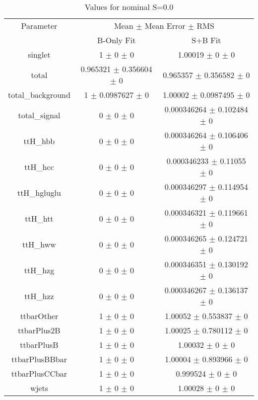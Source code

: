\begin{table}
\centering
\caption{Values for nominal S=0.0}
\begin{tabular}{ccc}
\toprule
Parameter & \multicolumn{2}{c}{Mean $\pm$ Mean Error $\pm$ RMS}\\
 & B-Only Fit & S+B Fit\\
\midrule
singlet & \num{1} $\pm$ \num{0} $\pm$ \num{0} & \num{1.00019} $\pm$ \num{0} $\pm$ \num{0}\\
total & \num{0.965321} $\pm$ \num{0.356604} $\pm$ \num{0} & \num{0.965357} $\pm$ \num{0.356582} $\pm$ \num{0}\\
total\_background & \num{1} $\pm$ \num{0.0987627} $\pm$ \num{0} & \num{1.00002} $\pm$ \num{0.0987495} $\pm$ \num{0}\\
total\_signal & \num{0} $\pm$ \num{0} $\pm$ \num{0} & \num{0.000346264} $\pm$ \num{0.102484} $\pm$ \num{0}\\
ttH\_hbb & \num{0} $\pm$ \num{0} $\pm$ \num{0} & \num{0.000346264} $\pm$ \num{0.106406} $\pm$ \num{0}\\
ttH\_hcc & \num{0} $\pm$ \num{0} $\pm$ \num{0} & \num{0.000346233} $\pm$ \num{0.11055} $\pm$ \num{0}\\
ttH\_hgluglu & \num{0} $\pm$ \num{0} $\pm$ \num{0} & \num{0.000346297} $\pm$ \num{0.114954} $\pm$ \num{0}\\
ttH\_htt & \num{0} $\pm$ \num{0} $\pm$ \num{0} & \num{0.000346321} $\pm$ \num{0.119661} $\pm$ \num{0}\\
ttH\_hww & \num{0} $\pm$ \num{0} $\pm$ \num{0} & \num{0.000346265} $\pm$ \num{0.124721} $\pm$ \num{0}\\
ttH\_hzg & \num{0} $\pm$ \num{0} $\pm$ \num{0} & \num{0.000346351} $\pm$ \num{0.130192} $\pm$ \num{0}\\
ttH\_hzz & \num{0} $\pm$ \num{0} $\pm$ \num{0} & \num{0.000346267} $\pm$ \num{0.136137} $\pm$ \num{0}\\
ttbarOther & \num{1} $\pm$ \num{0} $\pm$ \num{0} & \num{1.00052} $\pm$ \num{0.553837} $\pm$ \num{0}\\
ttbarPlus2B & \num{1} $\pm$ \num{0} $\pm$ \num{0} & \num{1.00025} $\pm$ \num{0.780112} $\pm$ \num{0}\\
ttbarPlusB & \num{1} $\pm$ \num{0} $\pm$ \num{0} & \num{1.00032} $\pm$ \num{0} $\pm$ \num{0}\\
ttbarPlusBBbar & \num{1} $\pm$ \num{0} $\pm$ \num{0} & \num{1.00004} $\pm$ \num{0.893966} $\pm$ \num{0}\\
ttbarPlusCCbar & \num{1} $\pm$ \num{0} $\pm$ \num{0} & \num{0.999524} $\pm$ \num{0} $\pm$ \num{0}\\
wjets & \num{1} $\pm$ \num{0} $\pm$ \num{0} & \num{1.00028} $\pm$ \num{0} $\pm$ \num{0}\\
\bottomrule
\end{tabular}
\end{table}